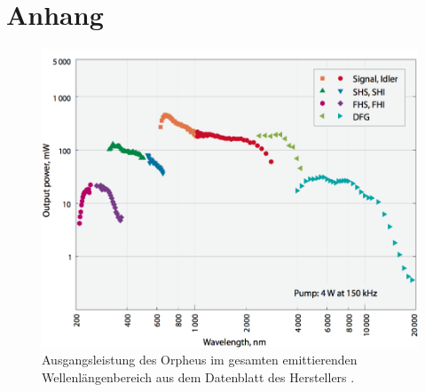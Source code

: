 \documentclass[bachelor,       %
               twoside,        %
               BCOR10mm,       %
               english,ngerman, %
               ]{GAUBM}
\begin{document}


\appendix
\chapter{Anhang}
\begin{figure}[h]
	\centering
	\includegraphics[width=0.7\linewidth]{Orpheus_Tuning_Curve}
	\caption{Ausgangsleistung des Orpheus im gesamten emittierenden Wellenlängenbereich aus dem Datenblatt des Herstellers \cite{orpheus_tuningcurve}.}
	\label{fig:orpheus_tuningcurve}
\end{figure}


\cleardoublepage

\end{document}
